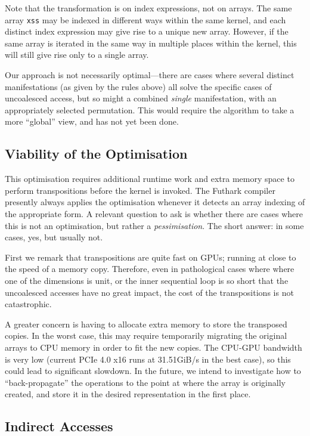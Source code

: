 Note that the transformation is on index expressions, not on arrays.
The same array \lstinline{xss} may be indexed in different ways within
the same kernel, and each distinct index expression may give rise to a
unique new  array.  However, if the same array is
iterated in the same way in multiple places within the kernel, this
will still give rise only to a single array.

Our approach is not necessarily optimal---there are cases where
several distinct manifestations (as given by the rules above) all
solve the specific cases of uncoalesced access, but so might a
combined \textit{single} manifestation, with an appropriately selected
permutation.  This would require the algorithm to take a more
``global'' view, and has not yet been done.

\subsection{Viability of the Optimisation}

This optimisation requires additional runtime work and extra memory
space to perform transpositions before the kernel is invoked.  The
Futhark compiler presently always applies the optimisation whenever it
detects an array indexing of the appropriate form.  A relevant
question to ask is whether there are cases where this is not an
optimisation, but rather a \textit{pessimisation}.  The short answer:
in some cases, yes, but usually not.

First we remark that transpositions are quite fast on GPUs; running at
close to the speed of a memory copy.  Therefore, even in pathological
cases where where one of the dimensions is unit, or the inner
sequential loop is so short that the uncoalesced accesses have no
great impact, the cost of the transpositions is not catastrophic.

A greater concern is having to allocate extra memory to store the
transposed copies.  In the worst case, this may require temporarily
migrating the original arrays to CPU memory in order to fit the new
copies.  The CPU-GPU bandwidth is very low (current PCIe 4.0 x16 runs
at 31.51GiB/s in the best case), so this could lead to significant
slowdown.  In the future, we intend to investigate how to
``back-propagate'' the  operations to the point at where
the array is originally created, and store it in the desired
representation in the first place.

\subsection{Indirect Accesses}

